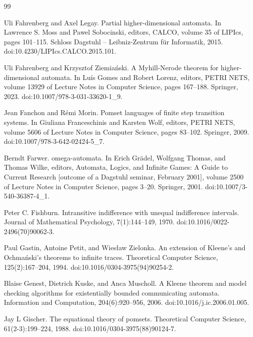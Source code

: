 \documentclass[10pt,a4paper]{article}
\begin{document}
\begin{thebibliography}{99}
\par\noindent    Uli Fahrenberg and Axel Legay.  Partial higher-dimensional automata.  In Lawrence S. Moss and Pawel Sobocinski, editors, CALCO, volume 35 of LIPIcs, pages 101–115. Schloss Dagstuhl – Leibniz-Zentrum für Informatik, 2015.  doi:10.4230/LIPIcs.CALCO.2015.101.  

\par\noindent    Uli Fahrenberg and Krzysztof Ziemiański.  A Myhill-Nerode theorem for higher-dimensional automata.  In Luís Gomes and Robert Lorenz, editors, PETRI NETS, volume 13929 of Lecture Notes in Computer Science, pages 167–188. Springer, 2023.  doi:10.1007/978-3-031-33620-1\_9.  

\par\noindent    Jean Fanchon and Rémi Morin.  Pomset languages of finite step transition systems.  In Giuliana Franceschinis and Karsten Wolf, editors, PETRI NETS, volume 5606 of Lecture Notes in Computer Science, pages 83–102. Springer, 2009.  doi:10.1007/978-3-642-02424-5\_7.  

\par\noindent    Berndt Farwer.  omega-automata.  In Erich Grädel, Wolfgang Thomas, and Thomas Wilke, editors, Automata, Logics, and Infinite Games: A Guide to Current Research [outcome of a Dagstuhl seminar, February 2001], volume 2500 of Lecture Notes in Computer Science, pages 3–20. Springer, 2001.  doi:10.1007/3-540-36387-4\_1.  

\par\noindent    Peter C. Fishburn.  Intransitive indifference with unequal indifference intervals.  Journal of Mathematical Psychology, 7(1):144–149, 1970.  doi:10.1016/0022-2496(70)90062-3.  

\par\noindent    Paul Gastin, Antoine Petit, and Wiesław Zielonka.  An extension of Kleene’s and Ochmański’s theorems to infinite traces.  Theoretical Computer Science, 125(2):167–204, 1994.  doi:10.1016/0304-3975(94)90254-2.  

\par\noindent    Blaise Genest, Dietrich Kuske, and Anca Muscholl.  A Kleene theorem and model checking algorithms for existentially bounded communicating automata.  Information and Computation, 204(6):920–956, 2006.  doi:10.1016/j.ic.2006.01.005.  

\par\noindent    Jay L Gischer.  The equational theory of pomsets.  Theoretical Computer Science, 61(2-3):199–224, 1988.  doi:10.1016/0304-3975(88)90124-7.  


\end{thebibliography}
\end{document}
